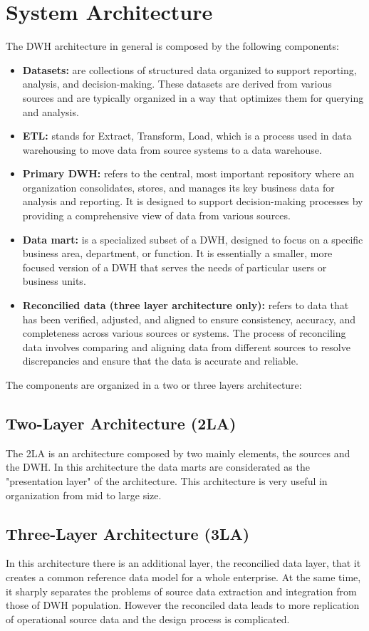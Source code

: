 \documentclass[conference]{IEEEtran}
\begin{document}
	\section{System Architecture}
	The DWH architecture in general is composed by the following components:
	\begin{itemize}
		\item \textbf{Datasets:} are collections of structured data organized to support reporting, analysis, and decision-making. These datasets are derived from various sources and are typically organized in a way that optimizes them for querying and analysis. 
		\item \textbf{ETL:} stands for Extract, Transform, Load, which is a process used in data warehousing to move data from source systems to a data warehouse.
		\item \textbf{Primary DWH:} refers to the central, most important repository where an organization consolidates, stores, and manages its key business data for analysis and reporting. It is designed to support decision-making processes by providing a comprehensive view of data from various sources.
		\item \textbf{Data mart:} is a specialized subset of a DWH, designed to focus on a specific business area, department, or function. It is essentially a smaller, more focused version of a DWH that serves the needs of particular users or business units. 
		\item \textbf{Reconcilied data (three layer architecture only):} refers to data that has been verified, adjusted, and aligned to ensure consistency, accuracy, and completeness across various sources or systems. The process of reconciling data involves comparing and aligning data from different sources to resolve discrepancies and ensure that the data is accurate and reliable.
	\end{itemize}
	
	The components are organized in a two or three layers architecture: 	
	\subsection{Two-Layer Architecture (2LA)}
	The 2LA is an architecture composed by two mainly elements, the sources and the DWH. In this architecture the data marts are considerated as the "presentation layer" of the architecture. This architecture is very useful in organization from mid to large size. \\
	\subsection{Three-Layer Architecture (3LA)}
	In this architecture there is an additional layer, the reconcilied data layer, that it creates a common reference data model for a whole enterprise. At the same time, it sharply separates the problems of source data extraction and integration from those of DWH population. However the reconciled data leads to more replication of operational source data and the	design process is complicated. \\
			
\end{document}
